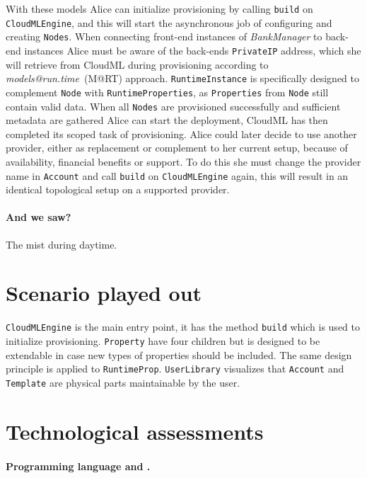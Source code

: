 With these models Alice can initialize provisioning by calling 
\texttt{build} on \texttt{CloudMLEngine},
and this will start the asynchronous job of configuring and creating \texttt{Nodes}.
When connecting front-end instances of \emph{BankManager} to back-end instances Alice must 
be aware of the back-ends \texttt{PrivateIP} address, which she will retrieve from CloudML
during provisioning according to \emph{models@run.time}~(M@RT) approach.
\texttt{RuntimeInstance} is specifically designed to complement \texttt{Node} with \texttt{RuntimeProperties},
as \texttt{Properties} from \texttt{Node} still contain valid data.
When all \texttt{Nodes} are provisioned successfully and sufficient metadata are gathered
Alice can start the deployment, CloudML has then completed its scoped task of provisioning.
Alice could later decide to use another provider, either as replacement or complement to her current setup,
because of availability, financial benefits or support.
To do this she must change the provider name in \texttt{Account} and call \texttt{build} on \texttt{CloudMLEngine} again,
this will result in an identical topological setup on a supported provider.

\paragraph{And we saw?}

The mist during daytime.

\section{Scenario played out}

\texttt{CloudMLEngine} is the main entry point, it has the method \texttt{build}
which is used to initialize provisioning.
\texttt{Property} have four children but is designed to be extendable in case
new types of properties should be included. The same design principle
is applied to \texttt{RuntimeProp}.
\texttt{UserLibrary} visualizes that \texttt{Account} and \texttt{Template} are 
physical parts maintainable by the user.






\section{Technological assessments}

\paragraph{Programming language and .}

